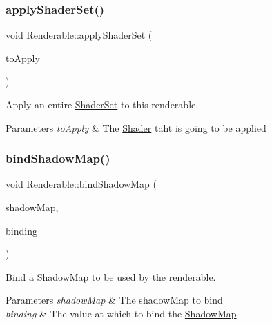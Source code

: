 \subsubsection{\texorpdfstring{applyShaderSet()}{applyShaderSet()}}
{\footnotesize\ttfamily void Renderable\+::apply\+Shader\+Set (\begin{DoxyParamCaption}\item[{const \mbox{\hyperlink{struct_shader_set}{Shader\+Set}} \&}]{to\+Apply }\end{DoxyParamCaption})}



Apply an entire \mbox{\hyperlink{struct_shader_set}{Shader\+Set}} to this renderable. 


\begin{DoxyParams}{Parameters}
{\em to\+Apply} & The \mbox{\hyperlink{class_shader}{Shader}} taht is going to be applied \\
\hline
\end{DoxyParams}
\mbox{\label{class_renderable_a16cfd403246dc15dca9b029bab7f2705}} 
\subsubsection{\texorpdfstring{bindShadowMap()}{bindShadowMap()}}
{\footnotesize\ttfamily void Renderable\+::bind\+Shadow\+Map (\begin{DoxyParamCaption}\item[{const \mbox{\hyperlink{struct_shadow_map}{Shadow\+Map}} \&}]{shadow\+Map,  }\item[{uint32\+\_\+t}]{binding }\end{DoxyParamCaption})}



Bind a \mbox{\hyperlink{struct_shadow_map}{Shadow\+Map}} to be used by the renderable. 


\begin{DoxyParams}{Parameters}
{\em shadow\+Map} & The shadow\+Map to bind \\
\hline
{\em binding} & The value at which to bind the \mbox{\hyperlink{struct_shadow_map}{Shadow\+Map}} \\
\hline
\end{DoxyParams}
\mbox{\label{class_renderable_ae0addbfb8f0af5438106b86da42adca2}} 
